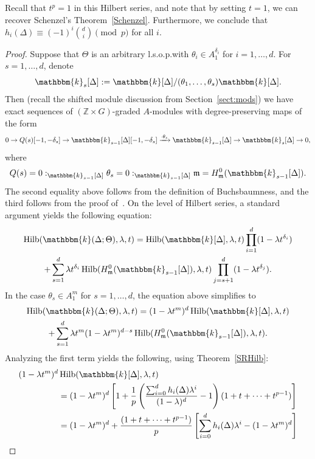\documentclass[ALCO,ThmDefs,Unicode]{cedram}
\DeclareMathOperator{\Hilb}{Hilb}
\newcommand{\field}{\mathbbm{k}}
\newcommand{\ZZ}{{\mathbb Z}}
\newcommand{\mideal}{\ensuremath{\mathfrak{m}}}
\begin{document}
\begin{rema}
Recall that $t^p=1$ in this Hilbert series, and note that by setting $t=1$, we can recover Schenzel's Theorem~\ref{Schenzel}. Furthermore, we conclude that $h_i(\Delta) \equiv (-1)^i\binom{d}{i} \pmod p$ for all $i$.
\end{rema}

\begin{proof}
Suppose that $\Theta$ is an arbitrary l.s.o.p.\@ with $\theta_i\in A_1^{\delta_i}$ for $i=1, \ldots, d$. For $s=1, \ldots, d$, denote
\[
\field_s[\Delta]:=\field[\Delta]/(\theta_1, \ldots, \theta_s)\field[\Delta].
\]
Then (recall the shifted module discussion from Section~\ref{sect:mods}) we have exact sequences of $(\ZZ\times G)$-graded $A$-modules with degree-preserving maps of the form
\[
0\to Q(s)[-1, -\delta_s]\to \field_{s-1}[\Delta][-1, -\delta_s]\xrightarrow{\cdot\theta_s} \field_{s-1}[\Delta]\to \field_s[\Delta]\to 0,
\]
where
\[
Q(s)=0:_{\field_{s-1}[\Delta]}\theta_s=0:_{\field_{s-1}[\Delta]}\mideal = H_\mideal^0(\field_{s-1}[\Delta]).
\]
The second equality above follows from the definition of Buchsbaumness, and the third follows from the proof of~\cite[Proposition~I.2.1]{StVo}. On the level of Hilbert series, a standard argument yields the following equation:
\begin{multline*}
\Hilb(\field(\Delta; \Theta), \lambda, t)=\Hilb(\field[\Delta], \lambda, t)\prod_{i=1}^d(1-\lambda t^{\delta_i})\\+\sum_{s=1}^d\lambda t^{\delta_i}\Hilb(H_\mideal^0(\field_{s-1}[\Delta]), \lambda, t)\prod_{j=s+1}^d(1-\lambda t^{\delta_j}).
\end{multline*}
In the case $\theta_s\in A_1^m$ for $s=1, \ldots, d$, the equation above simplifies to
\begin{multline*}
\Hilb(\field(\Delta; \Theta), \lambda, t)=(1-\lambda t^m)^d\Hilb(\field[\Delta], \lambda, t)\\+\sum_{s=1}^d\lambda t^m(1-\lambda t^m)^{d-s}\Hilb(H_\mideal^0(\field_{s-1}[\Delta]), \lambda, t).
\end{multline*}
Analyzing the first term yields the following, using Theorem~\ref{SRHilb}:
\begin{align*}
(1-\lambda t^m)^d&\Hilb(\field[\Delta], \lambda, t)\\
&=(1-\lambda t^m)^d\left[1+\frac{1}{p}\left(\frac{\sum_{i=0}^d h_i(\Delta)\lambda^i}{(1-\lambda)^d}-1\right)(1+t+\cdots+t^{p-1})\right]\\
&=(1-\lambda t^m)^d+\frac{(1+t+\cdots+t^{p-1})}{p}\left[\sum_{i=0}^dh_i(\Delta)\lambda^i - (1-\lambda t^m)^d\right]\\

\end{align*}
\end{proof}
\end{document}
